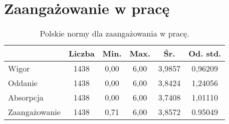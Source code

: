 \section{Zaangażowanie w pracę}
\label{sec:app-uwes-norms}

\begin{table}[h!]
\begin{center}
\begin{tabular}{l | c c c c c}
  & Liczba & Min. & Max. & Śr. & Od. std. \\ \hline
Wigor & 1438 & 0,00 & 6,00 & 3,9857 & 0,96209 \\
Oddanie & 1438 &  0,00 & 6,00 & 3,8424 & 1,24056 \\
Absorpcja & 1438 & 0,00 & 6,00 & 3,7408 & 1,01110 \\ \hline
Zaangażowanie & 1438 & 0,71 & 6,00 & 3,8572 & 0.95049 \\
\end{tabular}
\end{center}
\caption{Polskie normy dla zaangażowania w pracę.}
\label{tab:uwes-pl-norms}
\end{table}

